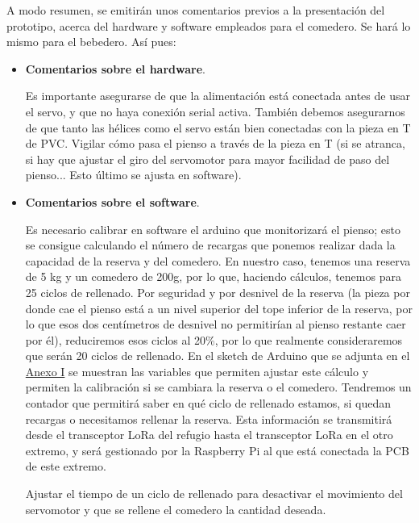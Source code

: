 \documentclass[12pt]{article}
\begin{document}
	\pagebreak 
	
	\noindent A modo resumen, se emitirán unos comentarios previos a la presentación del prototipo, acerca del hardware y software empleados para el comedero. Se hará lo mismo para el bebedero. Así pues:
	
	\begin{itemize}
		\item \textbf{Comentarios sobre el hardware}.
		\begin{outline}
			\1 Es importante asegurarse de que la alimentación está conectada antes de usar el servo, y que no haya conexión serial activa.
			\1 También debemos asegurarnos de que tanto las hélices como el servo están bien conectadas con la pieza en T de PVC. 
			\1 Vigilar cómo pasa el pienso a través de la pieza en T (si se atranca, si hay que ajustar el giro del servomotor para mayor facilidad de paso del pienso... Esto último se ajusta en software). 
		\end{outline}	
		\item \textbf{Comentarios sobre el software}.
		\begin{outline}
			\1 Es necesario calibrar en software el arduino que monitorizará el pienso; esto se consigue calculando el número de recargas que ponemos realizar dada la capacidad de la reserva y del comedero. En nuestro caso, tenemos una reserva de 5 kg y un comedero de 200g, por lo que, haciendo cálculos, tenemos para 25 ciclos de rellenado. Por seguridad y por desnivel de la reserva (la pieza por donde cae el pienso está a un nivel superior del tope inferior de la reserva, por lo que esos dos centímetros de desnivel no permitirían al pienso restante caer por él), reduciremos esos ciclos al 20\%, por lo que realmente consideraremos que serán 20 ciclos de rellenado. En el sketch de Arduino que se adjunta en el  \hyperref[anexo I: codigo]{Anexo I} se muestran las variables que permiten ajustar este cálculo y permiten la calibración si se cambiara la reserva o el comedero. Tendremos un contador que permitirá saber en qué ciclo de rellenado estamos, si quedan recargas o necesitamos rellenar la reserva. Esta información se transmitirá desde el transceptor LoRa del refugio hasta el transceptor LoRa en el otro extremo, y será gestionado por la Raspberry Pi al que está conectada la PCB de este extremo.
			
			\1 Ajustar el tiempo de un ciclo de rellenado para desactivar el movimiento del servomotor y que se rellene el comedero la cantidad deseada. \\
		\end{outline}
	
	\end{itemize}
\end{document}

